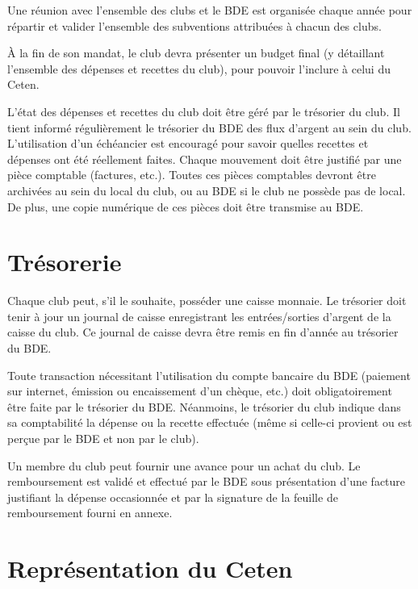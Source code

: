 \documentclass{article} %
\begin{document}
\begin{multicols}{2}
{			Une réunion avec l’ensemble des clubs et le BDE est
			organisée chaque année pour répartir et valider l’ensemble
			des subventions attribuées à chacun des clubs.
			
			À la fin de son mandat, le club devra présenter un budget
			final (y détaillant l’ensemble des dépenses et recettes du
			club), pour pouvoir l’inclure à celui du Ceten.

			L’état des dépenses et recettes du club doit être géré par le
			trésorier du club. Il tient informé régulièrement le trésorier
			du BDE des flux d’argent au sein du club. L’utilisation d’un
			échéancier est encouragé pour savoir quelles recettes et
			dépenses ont été réellement faites. Chaque mouvement doit
			être justifié par une pièce comptable (factures, etc.). Toutes
			ces pièces comptables devront être archivées au sein du
			local du club, ou au BDE si le club ne possède pas de local.
			De plus, une copie numérique de ces pièces doit être
			transmise au BDE\@.

		}

		\section{Trésorerie}

		{\small

			Chaque club peut, s’il le souhaite, posséder une caisse
			monnaie. Le trésorier doit tenir à jour un journal de caisse
			enregistrant les entrées/sorties d’argent de la caisse du
			club. Ce journal de caisse devra être remis en fin d’année au
			trésorier du BDE\@.

			Toute transaction nécessitant l’utilisation du compte
			bancaire du BDE (paiement sur internet, émission ou
			encaissement d’un chèque, etc.) doit obligatoirement être
			faite par le trésorier du BDE\@. Néanmoins, le trésorier du club
			indique dans sa comptabilité la dépense ou la recette
			effectuée (même si celle-ci provient ou est perçue par le BDE
			et non par le club).

			Un membre du club peut fournir une avance pour un achat
			du club. Le remboursement est validé et effectué par le BDE
			sous présentation d’une facture justifiant la dépense
			occasionnée et par la signature de la feuille de
			remboursement fourni en annexe.

		}

		\section{Représentation du Ceten}


\end{multicols}
\end{document}
